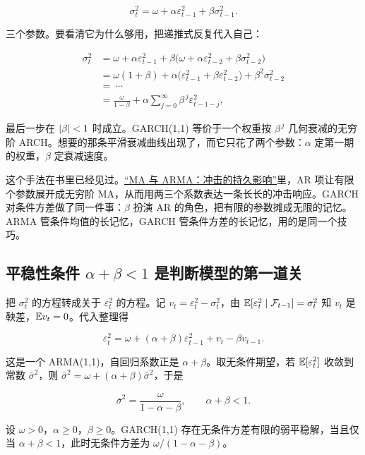 \[
\sigma_t^2=\omega+\alpha\varepsilon_{t-1}^2+\beta\sigma_{t-1}^2 .
\]

三个参数。要看清它为什么够用，把递推式反复代入自己：

\[
\begin{aligned}
\sigma_t^2
&=\omega+\alpha\varepsilon_{t-1}^2+\beta\big(\omega+\alpha\varepsilon_{t-2}^2+\beta\sigma_{t-2}^2\big)\\
&=\omega(1+\beta)+\alpha\big(\varepsilon_{t-1}^2+\beta\varepsilon_{t-2}^2\big)+\beta^2\sigma_{t-2}^2\\
&=\ \cdots\\
&=\frac{\omega}{1-\beta}+\alpha\sum_{j=0}^{\infty}\beta^{\,j}\varepsilon_{t-1-j}^2 ,
\end{aligned}
\]

最后一步在 \(\left|\beta\right|<1\) 时成立。GARCH(1,1) 等价于一个权重按 \(\beta^{\,j}\) 几何衰减的无穷阶 ARCH。想要的那条平滑衰减曲线出现了，而它只花了两个参数：\(\alpha\) 定第一期的权重，\(\beta\) 定衰减速度。

这个手法在书里已经见过。\hyperref[sec:06-Random-Processes/06-ARMA-and-ARIMA/02]{``MA 与 ARMA：冲击的持久影响''}里，AR 项让有限个参数展开成无穷阶 MA，从而用两三个系数表达一条长长的冲击响应。GARCH 对条件方差做了同一件事：\(\beta\) 扮演 AR 的角色，把有限的参数摊成无限的记忆。ARMA 管条件均值的长记忆，GARCH 管条件方差的长记忆，用的是同一个技巧。

\subsection{平稳性条件 \texorpdfstring{\(\alpha+\beta<1\)}{alpha+beta<1} 是判断模型的第一道关}

把 \(\sigma_t^2\) 的方程转成关于 \(\varepsilon_t^2\) 的方程。记 \(v_t=\varepsilon_t^2-\sigma_t^2\)，由 \(\mathbb{E}[\varepsilon_t^2\mid\mathcal F_{t-1}]=\sigma_t^2\) 知 \(v_t\) 是鞅差，\(\mathbb{E} v_t=0\)。代入整理得

\[
\varepsilon_t^2=\omega+(\alpha+\beta)\varepsilon_{t-1}^2+v_t-\beta v_{t-1}.
\]

这是一个 ARMA(1,1)，自回归系数正是 \(\alpha+\beta\)。取无条件期望，若 \(\mathbb{E}[\varepsilon_t^2]\) 收敛到常数 \(\bar\sigma^2\)，则 \(\bar\sigma^2=\omega+(\alpha+\beta)\bar\sigma^2\)，于是

\[
\bar\sigma^2=\frac{\omega}{1-\alpha-\beta},
\qquad \alpha+\beta<1 .
\]

\begin{proposition}
设 \(\omega>0\)，\(\alpha\ge0\)，\(\beta\ge0\)。GARCH(1,1) 存在无条件方差有限的弱平稳解，当且仅当 \(\alpha+\beta<1\)，此时无条件方差为 \(\omega/(1-\alpha-\beta)\)。
\end{proposition}

